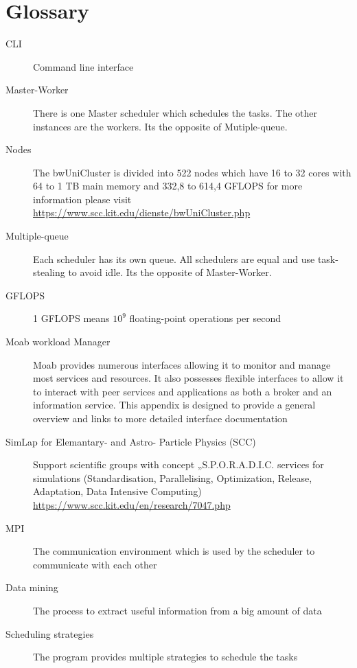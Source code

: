 \section{Glossary}
\begin{description}
	\item[CLI] Command line interface
	
	\item[Master-Worker] There is one Master scheduler which schedules the tasks. The other instances are the workers. Its the opposite of Mutiple-queue.

	\item[Nodes] The bwUniCluster is divided into 522 nodes which have 16 to 32 cores with 64 to 1 TB main memory and 332,8 to 614,4 GFLOPS for more information please visit \href{https://www.scc.kit.edu/dienste/bwUniCluster.php}{https://www.scc.kit.edu/dienste/bwUniCluster.php}

	\item[Multiple-queue]Each scheduler has its own queue. All schedulers are equal and use task-stealing to avoid idle. Its the opposite of Master-Worker.

	\item[GFLOPS] 1 GFLOPS means $10^9$ floating-point operations per second

	\item[Moab workload Manager] Moab provides numerous interfaces allowing it to monitor and manage most services and resources. It also possesses flexible interfaces to allow it to interact with peer services and applications as both a broker and an information service. This appendix is designed to provide a general overview and links to more detailed interface documentation

	\item [SimLap for Elemantary- and Astro-    Particle Physics (SCC)] Support scientific groups with concept „S.P.O.R.A.D.I.C. services for simulations (Standardisation, Parallelising, Optimization, Release, Adaptation, Data Intensive Computing) \href {https://www.scc.kit.edu/en/research/7047.php}{https://www.scc.kit.edu/en/research/7047.php}

	\item[MPI] The communication environment which is used by the scheduler to communicate with each other 

	\item[Data mining] The process to extract useful information from a big amount of data

	\item[Scheduling strategies] The program provides multiple strategies to schedule the tasks


\end{description}
